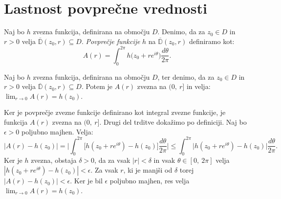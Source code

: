 \documentclass[mat1]{fmfdelo}
\begin{document}
\section{Lastnost povprečne vrednosti}

    \begin{definicija}  
        Naj bo $h$ zvezna funkcija, definirana na območju $D$. Denimo, da za $z_0 \in D$ in $r > 0$ velja $\overline{\mathbb{D}}(z_0, r) \subseteq D$. \emph{Povprečje funkcije} $h$ na $\overline{\mathbb{D}}(z_0, r)$ definiramo kot:
        $$
            A(r) = \int_{0}^{2 \pi}{h \big(z_0 + r e^{i\theta}\big)\frac{d\theta}{2 \pi}}.
        $$
    \end{definicija}
    \begin{trditev}
        \label{zvpov}
        Naj bo $h$ zvezna funkcija, definirana na območju $D$, ter denimo, da za $z_0 \in D$ in $r > 0$ velja $\overline{\mathbb{D}}(z_0, r) \subseteq D$. 
        Potem je $A(r)$ zvezna na $(0,~r]$ in velja: $\lim_{r \to 0}{A(r)} = h(z_0)$.
    \end{trditev}
    \begin{dokaz}
        Ker je povprečje zvezne funkcije definirano kot integral zvezne funkcije, je funkcija $A(r)$ zvezna na $(0,~r]$. Drugi del trditve dokažimo po definiciji.
        Naj bo $\epsilon > 0$ poljubno majhen. Velja:
        $$
            |A(r) - h(z_0)| = \bigg|\int_{0}^{2\pi} \big[h(z_0 + r e^{i\theta})  - h(z_0)\big] \frac{d\theta}{2\pi} \bigg| \leq \int_{0}^{2 \pi} \big| h(z_0 + r e^{i\theta}) - h(z_0) \big| \frac{d\theta}{2 \pi}.
        $$
        Ker je $h$ zvezna, obstaja $\delta > 0$, da za vsak $|r| < \delta$ in vsak $\theta \in [0,~2\pi]$ velja \mbox{$|h(z_0 + r e^{i\theta}) - h(z_0)| < \epsilon$}.
        Za vsak $r$, ki je manjši od $\delta$ torej $|A(r) - h(z_0)| < \epsilon$. Ker je bil $\epsilon$ poljubno majhen, res velja $\lim_{r \to 0}{A(r)} = h(z_0)$.
    \end{dokaz}
\end{document}
